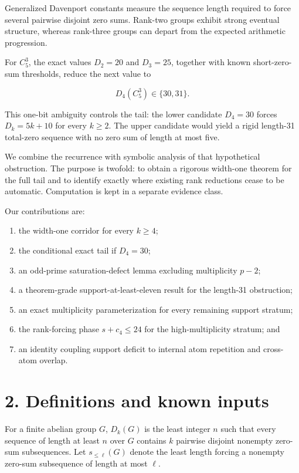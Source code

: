 \documentclass[
  11pt,
]{article}
\providecommand{\tightlist}{%
  \setlength{\itemsep}{0pt}\setlength{\parskip}{0pt}}
\begin{document}
Generalized Davenport constants measure the sequence length required to
force several pairwise disjoint zero sums. Rank-two groups exhibit
strong eventual structure, whereas rank-three groups can depart from the
expected arithmetic progression.

For \(C_5^3\), the exact values \(D_2=20\) and \(D_3=25\), together with
known short-zero-sum thresholds, reduce the next value to

\[
D_4(C_5^3)\in\{30,31\}.
\]

This one-bit ambiguity controls the tail: the lower candidate \(D_4=30\)
forces \(D_k=5k+10\) for every \(k\ge2\). The upper candidate would
yield a rigid length-31 total-zero sequence with no zero sum of length
at most five.

We combine the recurrence with symbolic analysis of that hypothetical
obstruction. The purpose is twofold: to obtain a rigorous width-one
theorem for the full tail and to identify exactly where existing rank
reductions cease to be automatic. Computation is kept in a separate
evidence class.

Our contributions are:

\begin{enumerate}
\def\labelenumi{\arabic{enumi}.}
\tightlist
\item
  the width-one corridor for every \(k\ge4\);
\item
  the conditional exact tail if \(D_4=30\);
\item
  an odd-prime saturation-defect lemma excluding multiplicity \(p-2\);
\item
  a theorem-grade support-at-least-eleven result for the length-31
  obstruction;
\item
  an exact multiplicity parameterization for every remaining support
  stratum;
\item
  the rank-forcing phase \(s+c_4\le24\) for the high-multiplicity
  stratum; and
\item
  an identity coupling support deficit to internal atom repetition and
  cross-atom overlap.
\end{enumerate}

\hypertarget{definitions-and-known-inputs}{%
\section{2. Definitions and known
inputs}\label{definitions-and-known-inputs}}

For a finite abelian group \(G\), \(D_k(G)\) is the least integer \(n\)
such that every sequence of length at least \(n\) over \(G\) contains
\(k\) pairwise disjoint nonempty zero-sum subsequences. Let
\(s_{\le\ell}(G)\) denote the least length forcing a nonempty zero-sum
subsequence of length at most \(\ell\).
\end{document}
